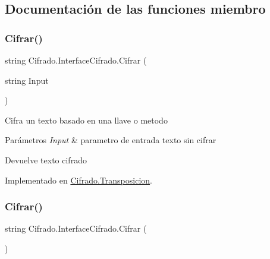 \subsection{Documentación de las funciones miembro}
\mbox{\label{interface_cifrado_1_1_interface_cifrado_a67baf37475e65a3cf07a0546309cf391}} 
\subsubsection{\texorpdfstring{Cifrar()}{Cifrar()}\hspace{0.1cm}{\footnotesize\ttfamily [1/2]}}
{\footnotesize\ttfamily string Cifrado.\+Interface\+Cifrado.\+Cifrar (\begin{DoxyParamCaption}\item[{string}]{Input }\end{DoxyParamCaption})}



Cifra un texto basado en una llave o metodo 


\begin{DoxyParams}{Parámetros}
{\em Input} & parametro de entrada texto sin cifrar\\
\hline
\end{DoxyParams}
\begin{DoxyReturn}{Devuelve}
texto cifrado
\end{DoxyReturn}


Implementado en \hyperlink{class_cifrado_1_1_transposicion_a34feeb193fcf5f9bf3385043dae4b4c8}{Cifrado.\+Transposicion}.

\mbox{\label{interface_cifrado_1_1_interface_cifrado_ade6b2a14d9cd48feec78c2695a2149bc}} 
\subsubsection{\texorpdfstring{Cifrar()}{Cifrar()}\hspace{0.1cm}{\footnotesize\ttfamily [2/2]}}
{\footnotesize\ttfamily string Cifrado.\+Interface\+Cifrado.\+Cifrar (\begin{DoxyParamCaption}{ }\end{DoxyParamCaption})}



